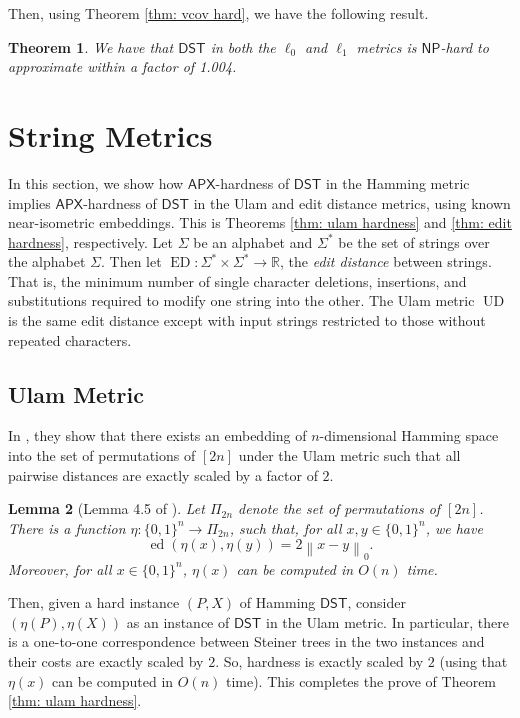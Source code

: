 \documentclass{article}\providecommand{\DeclareRedundantLanguages}[2]{}\usepackage[a4paper,margin=20mm]{geometry}
\newtheorem{theorem}{Theorem}\newtheorem{lemma}[theorem]{Lemma}\newtheorem{proposition}[theorem]{Proposition}\newtheorem{corollary}[theorem]{Corollary}\newtheorem{definition}[theorem]{Definition}\newtheorem{claim}[theorem]{Claim}\newtheorem{remark}[theorem]{Remark}\newtheorem{observation}[theorem]{Observation}\newtheorem{conjecture}[theorem]{Conjecture}\newtheorem{example}[theorem]{Example}
\DeclareMathOperator{\ED}{ED}
\DeclareMathOperator{\UD}{UD}
\DeclareMathOperator{\ed}{ed}
\newcommand{\R}{\mathbb{R}}
\newcommand{\1}{\textbf{1}}
\newcommand{\norm}[1]{\left\lVert#1\right\rVert}
\newcommand{\dst}{$\mathsf{DST}$\xspace}
\newcommand{\np}{$\mathsf{NP}$\xspace}
\newcommand{\apx}{$\mathsf{APX}$\xspace}
\begin{document}
Then, using Theorem \ref{thm: vcov hard}, we have the following result.

\begin{theorem}
We have that  \dst in both the $\ell_0$ and $\ell_1$ metrics is \np-hard to approximate within a factor of 1.004.
\end{theorem}




\section{String Metrics} \label{sec: string metrics}
In this section, we show how \apx-hardness of \dst in the Hamming metric implies \apx-hardness of \dst in the Ulam and edit distance metrics, using known near-isometric embeddings. This is Theorems \ref{thm: ulam hardness} and \ref{thm: edit hardness}, respectively. Let $\Sigma$ be an alphabet and $\Sigma^*$ be the set of strings over the alphabet $\Sigma$. Then let $\ED : \Sigma^* \times \Sigma^* \to \R$, the \textit{edit distance} between strings. That is, the minimum number of single character deletions, insertions, and substitutions required to modify one string into the other. The Ulam metric $\UD$ is the same edit distance except with input strings restricted to those without repeated characters.

\subsection{Ulam Metric}
In \cite{DBLP:journals/corr/abs-2112-03222}, they show that there exists an embedding of $n$-dimensional Hamming space into the set of permutations of $[2n]$ under the Ulam metric such that all pairwise distances are exactly scaled by a factor of $2$.

\begin{lemma}[Lemma 4.5 of \cite{DBLP:journals/corr/abs-2112-03222}]
Let $\Pi_{2n}$ denote the set of permutations of $[2n]$. There is a function $\eta: \{0,1\}^n \to \Pi_{2n}$, such that, for all $x, y \in \{0,1\}^n$, we have
\[
\ed(\eta(x), \eta(y)) = 2 \norm{x - y}_0.
\]
Moreover, for all $x \in \{0,1\}^n$, $\eta(x)$ can be computed in $O(n)$ time.
\end{lemma}

Then, given a hard instance $(P, X)$ of Hamming \dst, consider $(\eta(P), \eta(X))$ as an instance of \dst in the Ulam metric. In particular, there is a one-to-one correspondence between Steiner trees in the two instances and their costs are exactly scaled by $2$. So, hardness is exactly scaled by $2$ (using that $\eta(x)$ can be computed in $O(n)$ time). This completes the prove of Theorem \ref{thm: ulam hardness}.
\end{document}

